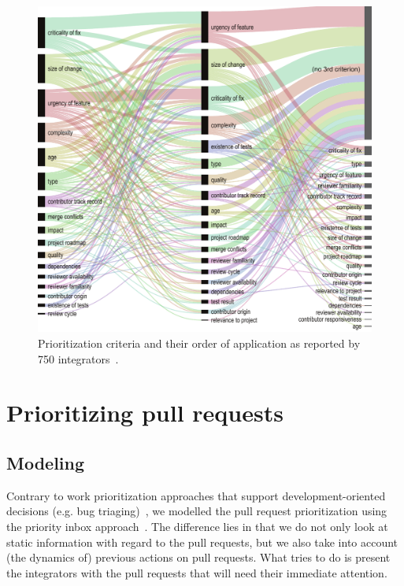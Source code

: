 \documentclass[conference]{IEEEtran}
\begin{document}
\begin{figure}[t]
  \begin{center}
    \includegraphics[scale=0.44]{../figs/prioritization-criteria}
  \end{center}
  \vspace{-2.5mm}
  \caption{Prioritization criteria and their order of application as reported by
  750 integrators~\cite{GZSD15}.}
  \label{fig:prioritization}
  \vspace{-5mm}
\end{figure}


\section{Prioritizing pull requests}

\subsection{Modeling} 
Contrary to work prioritization approaches that support development-oriented 
decisions (e.g. bug triaging)~\cite{AnvikTSE2011,Jeong:2009:IBT:1595696.1595715,Tamrawi:2011:FSC:2025113.2025163}, we modelled the pull 
request prioritization using the priority inbox approach~\cite{Conway2011}. The
difference lies in that we do not only look at static information with regard to the 
pull requests, but we also take into account (the dynamics of) previous actions on pull requests. 
What \prioritizer tries to do is present the integrators with the pull requests 
that will need their immediate attention.
\end{document}
